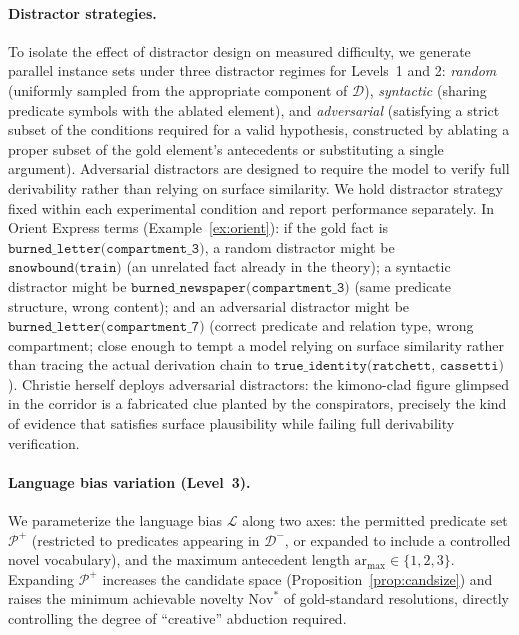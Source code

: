 \documentclass{article}
\theoremstyle{definition}
\newcommand{\D}{\mathcal{D}}
\newcommand{\Dm}{\mathcal{D}^{-}}
\newcommand{\La}{\mathcal{L}}
\newcommand{\Nov}{\mathrm{Nov}}
\begin{document}
\paragraph{Distractor strategies.} To isolate the effect of distractor design on measured difficulty, we generate parallel instance sets under three distractor regimes for Levels~1 and 2: \textit{random} (uniformly sampled from the appropriate component of $\D$), \textit{syntactic} (sharing predicate symbols with the ablated element), and \textit{adversarial} (satisfying a strict subset of the conditions required for a valid hypothesis, constructed by ablating a proper subset of the gold element's antecedents or substituting a single argument). Adversarial distractors are designed to require the model to verify full derivability rather than relying on surface similarity. We hold distractor strategy fixed within each experimental condition and report performance separately. In Orient Express terms (Example~\ref{ex:orient}): if the gold fact is $\texttt{burned\_letter(compartment\_3)}$, a random distractor might be $\texttt{snowbound(train)}$ (an unrelated fact already in the theory); a syntactic distractor might be $\texttt{burned\_newspaper(compartment\_3)}$ (same predicate structure, wrong content); and an adversarial distractor might be $\texttt{burned\_letter(compartment\_7)}$ (correct predicate and relation type, wrong compartment; close enough to tempt a model relying on surface similarity rather than tracing the actual derivation chain to $\texttt{true\_identity(ratchett, cassetti)}$). Christie herself deploys adversarial distractors: the kimono-clad figure glimpsed in the corridor is a fabricated clue planted by the conspirators, precisely the kind of evidence that satisfies surface plausibility while failing full derivability verification.

\paragraph{Language bias variation (Level~3).} We parameterize the language bias $\La$ along two axes: the permitted predicate set $\mathcal{P}^+$ (restricted to predicates appearing in $\Dm$, or expanded to include a controlled novel vocabulary), and the maximum antecedent length $\mathrm{ar}_{\max} \in \{1, 2, 3\}$. Expanding $\mathcal{P}^+$ increases the candidate space (Proposition~\ref{prop:candsize}) and raises the minimum achievable novelty $\Nov^*$ of gold-standard resolutions, directly controlling the degree of ``creative'' abduction required.
\end{document}
